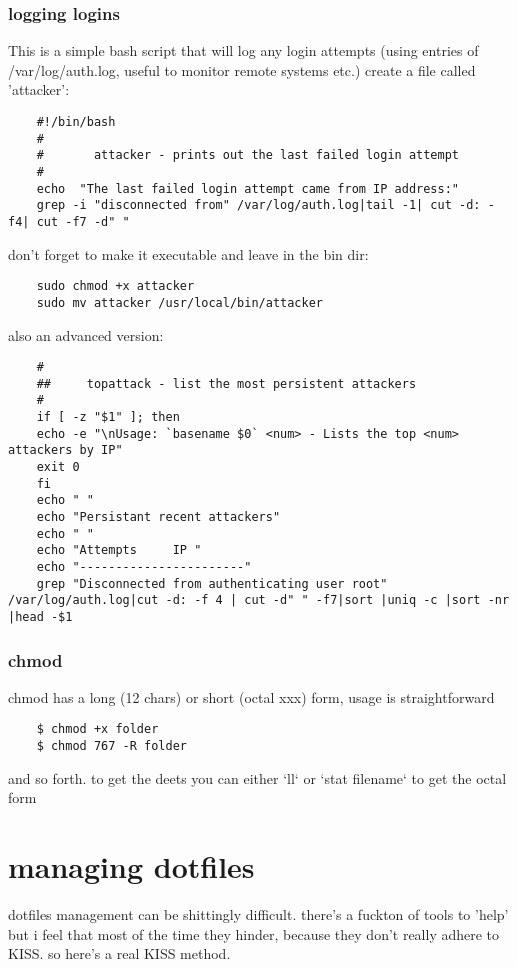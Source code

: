 \subsubsection{logging logins}%
\label{ssub:logging_logins}

This is a simple bash script that will log any login attempts (using entries of /var/log/auth.log, useful to monitor remote systems etc.)
create a file called 'attacker':
\begin{verbatim}
	#!/bin/bash
	#
	#       attacker - prints out the last failed login attempt
	#
	echo  "The last failed login attempt came from IP address:"
	grep -i "disconnected from" /var/log/auth.log|tail -1| cut -d: -f4| cut -f7 -d" "
\end{verbatim}
don't forget to make it executable and leave in the bin dir:
\begin{verbatim}
	sudo chmod +x attacker
	sudo mv attacker /usr/local/bin/attacker
\end{verbatim}

also an advanced version:
\begin{verbatim}
	#
	##     topattack - list the most persistent attackers
	#
	if [ -z "$1" ]; then
	echo -e "\nUsage: `basename $0` <num> - Lists the top <num> attackers by IP"
	exit 0
	fi
	echo " "
	echo "Persistant recent attackers"
	echo " "
	echo "Attempts     IP "
	echo "-----------------------"
	grep "Disconnected from authenticating user root" /var/log/auth.log|cut -d: -f 4 | cut -d" " -f7|sort |uniq -c |sort -nr |head -$1
\end{verbatim}

\subsubsection{chmod}%
\label{ssub:chmod}

chmod has a long (12 chars) or short (octal xxx) form, usage is straightforward
\begin{verbatim}
	$ chmod +x folder
	$ chmod 767 -R folder
\end{verbatim}
and so forth. to get the deets you can either `ll` or `stat filename` to get the octal form

\section{managing dotfiles}%
\label{sec:managing_dotfiles}

dotfiles management can be shittingly difficult. there's a fuckton of tools  to 'help' but i feel that most of the time they hinder, because they don't really adhere to KISS. so here's a real KISS method.

